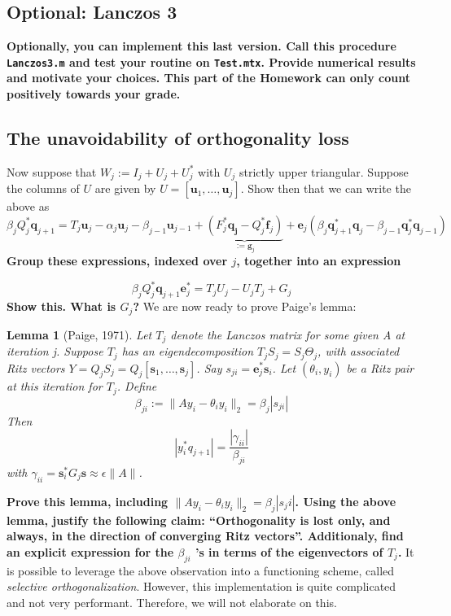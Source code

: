 \documentclass[12pt]{article}
\newtheorem{lemma}{Lemma}
\begin{document}
\subsection{Optional: Lanczos 3}
\textbf{Optionally, you can implement this last version. Call this procedure \texttt{Lanczos3.m} and test your routine on \texttt{Test.mtx}. Provide numerical results and motivate your choices. This part of the Homework can only count positively towards your grade.}
\subsection{The unavoidability of orthogonality loss}
Now suppose that $W_j:=I_j+U_j+U_j^{\ast}$ with $U_j$ strictly upper triangular. Suppose the columns of $U$ are given by $U=[\mathbf{u}_1,\ldots,\mathbf{u}_j]$. Show then that we can write the above as
$$\beta_jQ_{j}^{\ast}\mathbf{q}_{j+1}=T_{j}\mathbf{u}_j-\alpha_j\mathbf{u}_j-\beta_{j-1}\mathbf{u}_{j-1}+\underbrace{(F_j^{\ast}\mathbf{q_j}-Q_j^{\ast}\mathbf{f}_j)}_{:=\mathbf{g}_j}+\mathbf{e}_j(\beta_{j}\mathbf{q}_{j+1}^{\ast}\mathbf{q}_{j}-\beta_{j-1}\mathbf{q}_{j}^{\ast}\mathbf{q}_{j-1})$$
\textbf{Group these expressions, indexed over $j$, together into an expression}

$$\beta_{j}Q^{\ast}_j\mathbf{q}_{j+1}\mathbf{e}_j^{\ast}=T_jU_j-U_jT_j+G_j$$
\textbf{Show this. What is $G_j$?}
We are now ready to prove Paige's lemma:
\begin{lemma}[Paige, 1971]
Let $T_j$ denote the Lanczos matrix for some given A at iteration j. Suppose $T_j$ has an eigendecomposition $T_jS_j=S_j\Theta_j$, with associated Ritz vectors $Y=Q_jS_j=Q_j[\mathbf{s}_1,\dots,\mathbf{s}_j]$. Say $s_{ji}=\mathbf{e}_j^{\ast}\mathbf{s}_i$. Let
$(\theta_i , y_i)$ be a Ritz pair at this iteration for $T_j$. Define $$\beta_{ji} := \|Ay_i - \theta_i y_i\|_2=\beta_j|s_{ji}|$$
Then
$$|y_i^{\ast}q_{j+1}| =\frac{|\gamma_{ii}|}{\beta_{ji}}$$
with $\gamma_{ii}=\mathbf{s}_i^{\ast}G_{j}\mathbf{s}\approx\epsilon\|A\|$.
\end{lemma}
\textbf{Prove this lemma, including $\|Ay_i - \theta_i y_i\|_2=\beta_j|s_ji|$. Using the above lemma, justify the following claim: “Orthogonality is lost only, and always, in the direction of converging Ritz vectors”. Additionaly, find an explicit expression
for the $\beta_{ji}$ ’s in terms of the eigenvectors of $T_j$.} It is possible to leverage the above observation into a functioning scheme, called \emph{selective orthogonalization}. However, this implementation is quite complicated and not very performant. Therefore, we will not elaborate on this.
\end{document}
